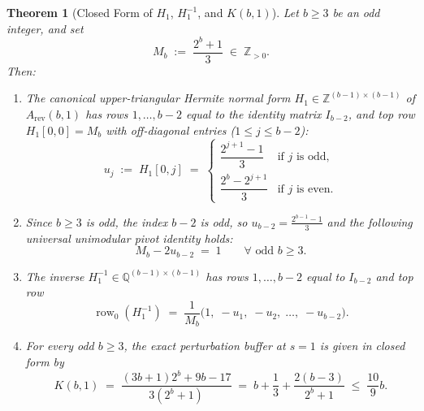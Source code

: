 \documentclass[11pt,a4paper]{article}
\theoremstyle{plain}
\newtheorem{theorem}{Theorem}[section]
\theoremstyle{definition}
\newcommand{\Z}{\mathbb{Z}}
\newcommand{\Q}{\mathbb{Q}}
\newcommand{\row}{\operatorname{row}}
\newcommand{\rev}{\operatorname{rev}}
\begin{document}
\begin{theorem}[Closed Form of $H_1$, $H_1^{-1}$, and $K(b,1)$]\label{thm:T1}
Let $b \ge 3$ be an odd integer, and set
\[
M_b \;:=\; \frac{2^b + 1}{3} \;\in\; \Z_{>0}.
\]
Then:
\begin{enumerate}[label=(\alph*)]
\item The canonical upper-triangular Hermite normal form $H_1 \in \Z^{(b-1) \times (b-1)}$ of $A_{\rev}(b,1)$ has rows $1, \dots, b-2$ equal to the identity matrix $I_{b-2}$, and top row $H_1[0,0] = M_b$ with off-diagonal entries ($1 \le j \le b-2$):
\begin{equation}\label{eq:u_j}
u_j \;:=\; H_1[0,j] \;=\; \begin{cases}
\dfrac{2^{j+1} - 1}{3} & \text{if } j \text{ is odd}, \\[10pt]
\dfrac{2^b - 2^{j+1}}{3} & \text{if } j \text{ is even}.
\end{cases}
\end{equation}
\item Since $b \ge 3$ is odd, the index $b-2$ is odd, so $u_{b-2} = \frac{2^{b-1}-1}{3}$ and the following \emph{universal unimodular pivot identity} holds:
\begin{equation}\label{eq:unimodular}
\boxed{\; M_b - 2 u_{b-2} \;=\; 1 \qquad \forall \text{ odd } b \ge 3. \;}
\end{equation}
\item The inverse $H_1^{-1} \in \Q^{(b-1) \times (b-1)}$ has rows $1, \dots, b-2$ equal to $I_{b-2}$ and top row
\[
\row_0(H_1^{-1}) \;=\; \frac{1}{M_b}\big(1,\; -u_1,\; -u_2,\; \dots,\; -u_{b-2}\big).
\]
\item For every odd $b \ge 3$, the exact perturbation buffer at $s = 1$ is given in closed form by
\begin{equation}\label{eq:K-b-1}
\boxed{\; K(b,1) \;=\; \frac{(3b + 1)2^b + 9b - 17}{3(2^b + 1)} \;=\; b + \frac{1}{3} + \frac{2(b-3)}{2^b + 1} \;\le\; \frac{10}{9} b. \;}
\end{equation}
\end{enumerate}
\end{theorem}
\end{document}
